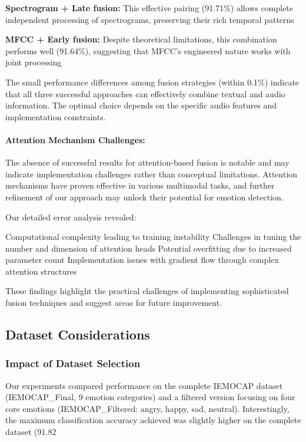 \documentclass[12pt]{article}
\begin{document}
    \textbf{Spectrogram + Late fusion:} This effective pairing (91.71\%) allows complete independent processing of spectrograms, preserving their rich temporal patterns
    
    \textbf{MFCC + Early fusion:} Despite theoretical limitations, this combination performs well (91.64\%), suggesting that MFCC's engineered nature works with joint processing

The small performance differences among fusion strategies (within 0.1\%) indicate that all three successful approaches can effectively combine textual and audio information. The optimal choice depends on the specific audio features and implementation constraints.

\paragraph{Attention Mechanism Challenges:}
The absence of successful results for attention-based fusion is notable and may indicate implementation challenges rather than conceptual limitations. Attention mechanisms have proven effective in various multimodal tasks, and further refinement of our approach may unlock their potential for emotion detection.

Our detailed error analysis revealed:

    Computational complexity leading to training instability
    Challenges in tuning the number and dimension of attention heads
    Potential overfitting due to increased parameter count
    Implementation issues with gradient flow through complex attention structures

These findings highlight the practical challenges of implementing sophisticated fusion techniques and suggest areas for future improvement.

\subsection{Dataset Considerations}

\subsubsection{Impact of Dataset Selection}
Our experiments compared performance on the complete IEMOCAP dataset (IEMOCAP\_Final, 9 emotion categories) and a filtered version focusing on four core emotions (IEMOCAP\_Filtered: angry, happy, sad, neutral). Interestingly, the maximum classification accuracy achieved was slightly higher on the complete dataset (91.82%
\end{document}
